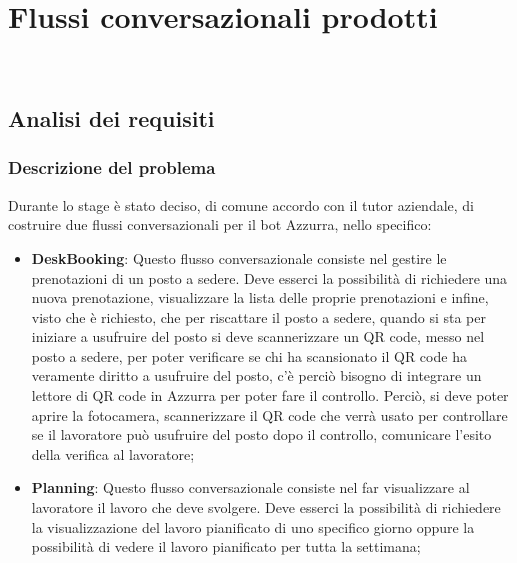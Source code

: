 
\chapter{Flussi conversazionali prodotti}
\label{cap:flussi di conversazione}

\\

\section{Analisi dei requisiti}
\subsection{Descrizione del problema}
Durante lo stage è stato deciso, di comune accordo con il tutor aziendale, di costruire due flussi conversazionali per il bot Azzurra, nello specifico:
\begin{itemize}
	\item \textbf{DeskBooking}: Questo flusso conversazionale consiste nel gestire le prenotazioni di un posto a sedere. Deve esserci la possibilità di richiedere una nuova prenotazione, visualizzare la lista delle proprie prenotazioni e infine, visto che è richiesto, che per riscattare il posto a sedere, quando si sta per iniziare a usufruire del posto si deve scannerizzare un QR code, messo nel posto a sedere, per poter verificare se chi ha scansionato il QR code ha veramente diritto a usufruire del posto, c'è perciò bisogno di integrare un lettore di QR code in Azzurra per poter fare il controllo. Perciò, si deve poter aprire la fotocamera, scannerizzare il QR code che verrà usato per controllare se il lavoratore può usufruire del posto dopo il controllo, comunicare l'esito della verifica al lavoratore;
	\item \textbf{Planning}: Questo flusso conversazionale consiste nel far visualizzare al lavoratore il lavoro che deve svolgere. Deve esserci la possibilità di richiedere la visualizzazione del lavoro pianificato di uno specifico giorno oppure la possibilità di vedere il lavoro pianificato per tutta la settimana;
\end{itemize}
